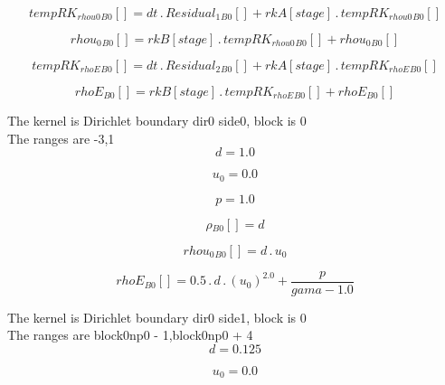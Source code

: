 \documentclass{article}
\begin{document}
\begin{dmath}{tempRK_{rhou0}{_{B0}}}[{}] = dt \,.\, {Residual_{1}{_{B0}}}[{}] + {rkA}[{stage}] \,.\, {tempRK_{rhou0}{_{B0}}}[{}]\end{dmath}

\begin{dmath}{rhou_{0}{_{B0}}}[{}] = {rkB}[{stage}] \,.\, {tempRK_{rhou0}{_{B0}}}[{}] + {rhou_{0}{_{B0}}}[{}]\end{dmath}

\begin{dmath}{tempRK_{rhoE}{_{B0}}}[{}] = dt \,.\, {Residual_{2}{_{B0}}}[{}] + {rkA}[{stage}] \,.\, {tempRK_{rhoE}{_{B0}}}[{}]\end{dmath}

\begin{dmath}{rhoE{_{B0}}}[{}] = {rkB}[{stage}] \,.\, {tempRK_{rhoE}{_{B0}}}[{}] + {rhoE{_{B0}}}[{}]\end{dmath}

\noindent The kernel is Dirichlet boundary dir0 side0, block is 0\\\noindent The ranges are -3,1\\\begin{dmath}d = 1.0\end{dmath}

\begin{dmath}u_{0} = 0.0\end{dmath}

\begin{dmath}p = 1.0\end{dmath}

\begin{dmath}{\rho{_{B0}}}[{}] = d\end{dmath}

\begin{dmath}{rhou_{0}{_{B0}}}[{}] = d \,.\, u_{0}\end{dmath}

\begin{dmath}{rhoE{_{B0}}}[{}] = 0.5 \,.\, d \,.\, \left(u_{0} \right)^{2.0} + \frac{p}{gama - 1.0}\end{dmath}

\noindent The kernel is Dirichlet boundary dir0 side1, block is 0\\\noindent The ranges are block0np0 - 1,block0np0 + 4\\\begin{dmath}d = 0.125\end{dmath}

\begin{dmath}u_{0} = 0.0\end{dmath}
\end{document}
